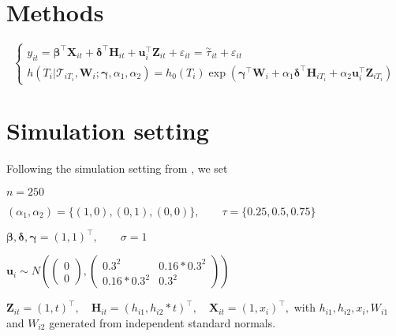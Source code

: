 \documentclass{article}
\begin{document}
\section{Methods}

\begin{equation}\label{eqn:joint}
\left\{
\begin{array}{l}
y_{it} = \boldsymbol{\beta}^{\top}{\boldsymbol X}_{it} + \boldsymbol{\delta}^{\top}{\boldsymbol H}_{it} + {\boldsymbol u}_i^{\top}{\boldsymbol Z}_{it} + \varepsilon_{it} =\overset{\sim}{\tau}_{it} + \varepsilon_{it}\\
h(T_i|\mathcal{T}_{iT_i}, {\boldsymbol W}_i;  \boldsymbol{\gamma}, \alpha_1, 
\alpha_2) = h_0(T_i)\exp(\boldsymbol{\gamma}^{\top}{\boldsymbol W}_i + \alpha_1\boldsymbol{\delta}^{\top}{\boldsymbol H}_{iT_i} + \alpha_2{\boldsymbol u}_i^{\top}{\boldsymbol Z}_{iT_i})
\end{array}
\right.
\end{equation}


\section{Simulation setting }
Following the simulation setting from \cite{farcomeni2014longitudinal}, we set\par

$n=250$\par
$(\alpha_1, \alpha_2)=\{(1, 0), (0, 1), (0, 0)\}, \hspace{2em}\tau=\{0.25, 0.5, 0.75\}$\par
$\boldsymbol{\beta, \delta, \gamma}=(1, 1)^{\top}, \hspace{2em} \sigma=1$\par
$\boldsymbol{u}_i\sim N\left(\begin{pmatrix} 0\\ 0\end{pmatrix}, \begin{pmatrix}0.3^2 & 0.16*0.3^2\\ 0.16*0.3^2 & 0.3^2\end{pmatrix} \right)$\par

${\boldsymbol Z}_{it}=(1, t)^{\top},\hspace{1em} {\boldsymbol H}_{it}=(h_{i1}, h_{i2}*t)^{\top},\hspace{1em} {\boldsymbol X}_{it}=(1, x_i)^{\top},$ with $h_{i1}, h_{i2}, x_i, W_{i1}$ and $W_{i2}$ generated from independent standard normals. \par
\end{document}
